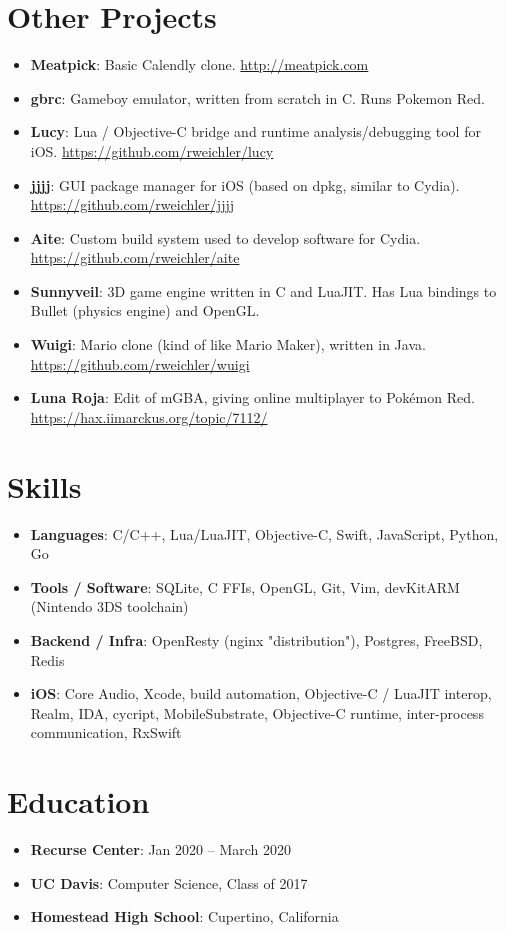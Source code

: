 \documentclass[letterpaper,11pt]{article}
\newcommand{\resumeItem}[2]{
  \item\small{
    \textbf{#1}{: #2 \vspace{-2.5pt}}
  }
}
\newcommand{\resumeItemAIDS}[2]{
  \item\small{
    \textbf{#1}{: #2 \vspace{-6.5pt}}
  }
}
\newcommand{\resumeSubItem}[2]{\resumeItem{#1}{#2}\vspace{-4pt}}
\newcommand{\resumeSubHeadingListStart}{\begin{itemize}[leftmargin=*]}
\newcommand{\resumeSubHeadingListEnd}{\end{itemize}}
\newcommand{\resumeItemListStart}{\begin{itemize}}
\newcommand{\resumeItemListEnd}{\end{itemize}\vspace{-5pt}}
\begin{document}
\section{Other Projects}
  \resumeSubHeadingListStart
    \resumeSubItem{Meatpick}
      {Basic Calendly clone. \href{http://meatpick.com}{http://meatpick.com}}
    \resumeSubItem{gbrc}
      {Gameboy emulator, written from scratch in C. Runs Pokemon Red.}
    \resumeSubItem{Lucy}
      {Lua / Objective-C bridge and runtime analysis/debugging tool for iOS. \href{https://github.com/rweichler/lucy}{https://github.com/rweichler/lucy}}
    \resumeSubItem{jjjj}
      {GUI package manager for iOS (based on dpkg, similar to Cydia).  \href{https://github.com/rweichler/jjjj}{https://github.com/rweichler/jjjj}}
    \resumeSubItem{Aite}
      {Custom build system used to develop software for Cydia. \href{https://github.com/rweichler/aite}{https://github.com/rweichler/aite}}
    \resumeSubItem{Sunnyveil}
      {3D game engine written in C and LuaJIT. Has Lua bindings to Bullet (physics engine) and OpenGL.}
    \resumeSubItem{Wuigi}
      {Mario clone (kind of like Mario Maker), written in Java. \href{https://github.com/rweichler/wuigi}{https://github.com/rweichler/wuigi}}
    \resumeSubItem{Luna Roja}
      {Edit of mGBA, giving online multiplayer to Pok\'emon Red.  \href{https://hax.iimarckus.org/topic/7112/}{https://hax.iimarckus.org/topic/7112/}}
  \resumeSubHeadingListEnd

  
\section{Skills}
    \resumeItemListStart
        \resumeItemAIDS{Languages}
            {C/C++, Lua/LuaJIT, Objective-C, Swift, JavaScript, Python, Go}
        \resumeItemAIDS{Tools / Software}
            {SQLite, C FFIs, OpenGL, Git, Vim, devKitARM (Nintendo 3DS toolchain)}
        \resumeItemAIDS{Backend / Infra}
            {OpenResty (nginx "distribution"), Postgres, FreeBSD, Redis}
        \resumeItemAIDS{iOS}
            {Core Audio, Xcode, build automation, Objective-C / LuaJIT interop, Realm, IDA, cycript, MobileSubstrate, Objective-C runtime, inter-process communication, RxSwift}
    \resumeItemListEnd


\section{Education}
  \resumeSubHeadingListStart
    \resumeSubItem
      {Recurse Center}{Jan 2020 -- March 2020}
    \resumeSubItem
      {UC Davis}{Computer Science, Class of 2017}
    \resumeSubItem
      {Homestead High School}{Cupertino, California}
  \resumeSubHeadingListEnd
\end{document}
